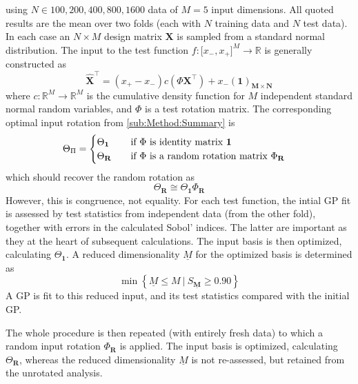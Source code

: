 \documentclass[preprint,12pt]{elsarticle}
\newcommand*{\M}[1]{\ensuremath{#1}\xspace}
\newcommand*{\vr}[1]{\M{\mathbf{#1}}}
\newcommand*{\st}[1]{\M{\mathbb{#1}}}
\newcommand{\T}[1]{\text{#1}}
\newcommand*{\QT}[2][]{\M{\quad\T{#2}\ifthenelse{\equal{#1}{}}{\quad}{#1}}}
\newcommand*{\setbuilder}[2]{\M{\left\lbrace#1 \: \big\vert \: #2\right\rbrace}}
\begin{document}
        
         using $N \in {100, 200, 400, 800, 1600}$ data of $M=5$ input dimensions. All quoted results are the mean over two folds (each with $N$ training data and $N$ test data).
        In each case an \M{N \times M} design matrix \vr{X} is sampled from a standard normal distribution. 
        The input to the test function \M{f\colon \lbrack x_-, x_+ \rbrack^{M} \to \st{R}} is generally constructed as
        \begin{equation} \label{def:Xhat}
            \vr{\hat{X}}^{\intercal} = (x_+ - x_-) c(\Phi \vr{X}^{\intercal}) + x_-(\vr{1})_{\vr{M} \times \vr{N}}
        \end{equation}
        where \M{c\colon \st{R}^M\to\st{R}^M} is the cumulative density function for \M{M} independent standard normal random variables, and \M{\Phi} is a test rotation matrix. 
        The corresponding optimal input rotation from \cref{sub:Method:Summary} is
        \begin{equation}
            \Theta_{\Pi} = \begin{cases}
                \Theta_{\vr{1}} & \QT{if \M{\Phi} is identity matrix \M{\vr{1}}} \\
                \Theta_{\vr{R}} & \QT{if \M{\Phi} is a random rotation matrix \M{\Phi_{\vr{R}}}}
            \end{cases}
        \end{equation}
        which should recover the random rotation as
        \begin{equation}
            \Theta_{\vr{R}} \cong \Theta_{\vr{1}} \Phi_{\vr{R}}
        \end{equation}
        However, this is congruence, not equality.
        For each test function, the intial GP fit is assessed by test statistics from independent data (from the other fold), together with errors in the calculated Sobol' indices. The latter are important as they at the heart of subsequent calculations. The input basis is then optimized, calculating $\Theta_{\vr{1}}$.
        A reduced dimensionality \M{\underline{M}} for the optimized basis is determined as 
        \begin{equation} \label{eq:Results:Mbar}
            \min \setbuilder{\underline{M} \leq M}{S_{\underline{\vr{M}}} \geq 0.90}
        \end{equation}
        A GP is fit to this reduced input, and its test statistics compared with the initial GP.

        The whole procedure is then repeated (with entirely fresh data) to which a random input rotation $\Phi_{\vr{R}}$ is applied. The input basis is optimized, calculating $\Theta_{\vr{R}}$, whereas the reduced dimensionality \M{\underline{M}} is not re-assessed, but retained from the unrotated analysis.
\end{document}

